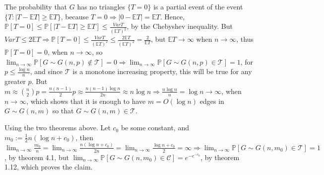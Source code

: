 \documentclass{article}
\begin{document}
\begin{enumerate}
The probability that $G$ has no triangles $\{T=0\}$ is a partial event of the event $\{T : |T-\mathbb{E}T|\geq\mathbb{E}T\}$, because $T=0\Rightarrow|0-\mathbb{E}T|=\mathbb{E}T$. Hence, $\mathbb{P}[T=0]\leq\mathbb{P}[|T-\mathbb{E}T|\geq\mathbb{E}T]\leq\frac{VarT}{(\mathbb{E}T)^2}$, by the Chebyshev inequality. But $VarT\leq{2\mathbb{E}T}\Rightarrow\mathbb{P}[T=0]\leq\frac{VarT}{(\mathbb{E}T)^2}\leq\frac{2\mathbb{E}T}{(\mathbb{E}T)^2}=\frac{2}{\mathbb{E}T}$, but $\mathbb{E}T\rightarrow\infty$ when $n\rightarrow\infty$, thus $\mathbb{P}[T=0]=0$, when $n\rightarrow\infty$, so $\lim_{n\rightarrow\infty}\mathbb{P}[G\sim{G(n,p)}\notin\mathcal{T}]=0\Rightarrow\lim_{n\rightarrow\infty}\mathbb{P}[G\sim{G(n,p)}\in\mathcal{T}]=1$, for $p\leq\frac{\log{n}}{n}$, and since $\mathcal{T}$ is a monotone increasing property, this will be true for any greater $p$. But $m\approx\binom{n}{2}p=\frac{n(n-1)}{2}p\approx\frac{n(n-1)\log{n}}{2n}\approx{n\log{n}}\Rightarrow\frac{n\log{n}}{n}=\log{n}\rightarrow\infty$, when $n\rightarrow\infty$, which shows that it is enough to have $m=O(\log{n})$ edges in $G\sim{G(n,m)}$ so that $G\sim{G(n,m)}\in\mathcal{T}$.
\end{enumerate}
    
    Using the two theorems above. Let $c_0$ be some constant, and $m_0:=\frac{1}{2}n(\log{n}+c_0)$, then $\lim_{n\rightarrow\infty}\frac{m_0}{n}=\lim_{n\rightarrow\infty}\frac{n(\log{n}+c_0)}{2n}=\lim_{n\rightarrow\infty}\frac{\log{n}+c_0}{2}=\infty\Rightarrow{\lim_{n\rightarrow\infty}\mathbb{P}[G\sim{G(n,m_0)}\in\mathcal{T}]}=1$, by theorem 4.1, but $\lim_{n\rightarrow\infty}\mathbb{P}[G\sim{G(n,m_0)}\in\mathcal{C}]=e^{-e^{-c_0}}$, by theorem 1.12, which proves the claim.
\end{document}
